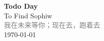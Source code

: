 \thispagestyle{empty}
\vspace*{\fill}
\begin{center}
    \textcolor{orange!50}{\Huge\textbf{Todo Day}} \\[1em]
    \textcolor{orange!60!pink}{\Large To Find Sophiw} \\[2em]
    \textcolor{gray}{\large 我在未来等你；现在去，跑着去} \\[1em]
    \today
\end{center}
\vspace*{\fill}
\clearpage


\clearpage

